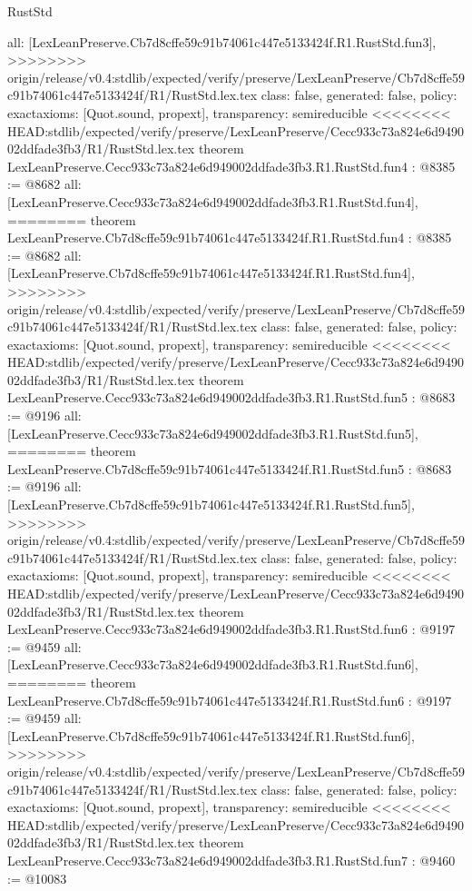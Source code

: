 \begin{lexlean}{RustStd}
\begin{coremodule}
{\begin{coremodule}
{{{{{{{  all: [LexLeanPreserve.Cb7d8cffe59c91b74061c447e5133424f.R1.RustStd.fun3],
>>>>>>>> origin/release/v0.4:stdlib/expected/verify/preserve/LexLeanPreserve/Cb7d8cffe59c91b74061c447e5133424f/R1/RustStd.lex.tex
  class: false,
  generated: false,
  policy: exact{axioms: [Quot.sound, propext]},
  transparency: semireducible
}
<<<<<<<< HEAD:stdlib/expected/verify/preserve/LexLeanPreserve/Cecc933c73a824e6d949002ddfade3fb3/R1/RustStd.lex.tex
theorem LexLeanPreserve.Cecc933c73a824e6d949002ddfade3fb3.R1.RustStd.fun4 : @8385 := @8682 {
  all: [LexLeanPreserve.Cecc933c73a824e6d949002ddfade3fb3.R1.RustStd.fun4],
========
theorem LexLeanPreserve.Cb7d8cffe59c91b74061c447e5133424f.R1.RustStd.fun4 : @8385 := @8682 {
  all: [LexLeanPreserve.Cb7d8cffe59c91b74061c447e5133424f.R1.RustStd.fun4],
>>>>>>>> origin/release/v0.4:stdlib/expected/verify/preserve/LexLeanPreserve/Cb7d8cffe59c91b74061c447e5133424f/R1/RustStd.lex.tex
  class: false,
  generated: false,
  policy: exact{axioms: [Quot.sound, propext]},
  transparency: semireducible
}
<<<<<<<< HEAD:stdlib/expected/verify/preserve/LexLeanPreserve/Cecc933c73a824e6d949002ddfade3fb3/R1/RustStd.lex.tex
theorem LexLeanPreserve.Cecc933c73a824e6d949002ddfade3fb3.R1.RustStd.fun5 : @8683 := @9196 {
  all: [LexLeanPreserve.Cecc933c73a824e6d949002ddfade3fb3.R1.RustStd.fun5],
========
theorem LexLeanPreserve.Cb7d8cffe59c91b74061c447e5133424f.R1.RustStd.fun5 : @8683 := @9196 {
  all: [LexLeanPreserve.Cb7d8cffe59c91b74061c447e5133424f.R1.RustStd.fun5],
>>>>>>>> origin/release/v0.4:stdlib/expected/verify/preserve/LexLeanPreserve/Cb7d8cffe59c91b74061c447e5133424f/R1/RustStd.lex.tex
  class: false,
  generated: false,
  policy: exact{axioms: [Quot.sound, propext]},
  transparency: semireducible
}
<<<<<<<< HEAD:stdlib/expected/verify/preserve/LexLeanPreserve/Cecc933c73a824e6d949002ddfade3fb3/R1/RustStd.lex.tex
theorem LexLeanPreserve.Cecc933c73a824e6d949002ddfade3fb3.R1.RustStd.fun6 : @9197 := @9459 {
  all: [LexLeanPreserve.Cecc933c73a824e6d949002ddfade3fb3.R1.RustStd.fun6],
========
theorem LexLeanPreserve.Cb7d8cffe59c91b74061c447e5133424f.R1.RustStd.fun6 : @9197 := @9459 {
  all: [LexLeanPreserve.Cb7d8cffe59c91b74061c447e5133424f.R1.RustStd.fun6],
>>>>>>>> origin/release/v0.4:stdlib/expected/verify/preserve/LexLeanPreserve/Cb7d8cffe59c91b74061c447e5133424f/R1/RustStd.lex.tex
  class: false,
  generated: false,
  policy: exact{axioms: [Quot.sound, propext]},
  transparency: semireducible
}
<<<<<<<< HEAD:stdlib/expected/verify/preserve/LexLeanPreserve/Cecc933c73a824e6d949002ddfade3fb3/R1/RustStd.lex.tex
theorem LexLeanPreserve.Cecc933c73a824e6d949002ddfade3fb3.R1.RustStd.fun7 : @9460 := @10083 {
}}}}}}}}}}
\end{coremodule}}
\end{coremodule}
\end{lexlean}

